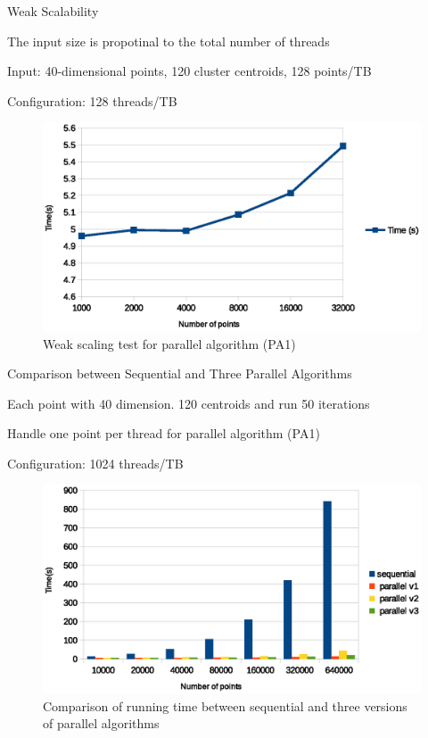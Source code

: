 \documentclass[
nopagebreaks,
style=klope,
fleqn]{powerdot}
\begin{document}
\begin{slide}{Weak Scalability}
  \begin{compactitem}
  \item{The input size is propotinal to the total number of threads}
  \item{Input: 40-dimensional points, 120 cluster centroids, 128 points/TB}
  \item{Configuration: 128 threads/TB}
  \end{compactitem}
  \begin{figure}[!h]
    \centering
    \includegraphics[width=0.7\linewidth]{fig/weak_scaling}
    \caption{Weak scaling test for parallel algorithm (PA1)}
    \label{fig:weak_scaling}
  \end{figure}
\end{slide}

\begin{slide}{Comparison between Sequential and Three Parallel Algorithms}
  \begin{compactitem}
  \item{Each point with 40 dimension. 120 centroids and run 50 iterations}
  \item{Handle one point per thread for parallel algorithm (PA1)}
  \item{Configuration: 1024 threads/TB}
  \end{compactitem}
  \begin{figure}[!h]
    \captionsetup{font=scriptsize}
    \centering
    \includegraphics[width=0.7\linewidth]{fig/all_comparison}
    \caption{Comparison of running time between sequential and three versions of parallel algorithms}
    \label{fig:all}
  \end{figure}
\end{slide}
\end{document}
